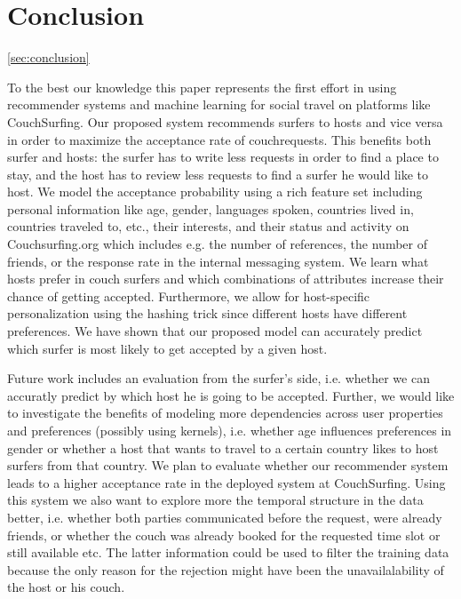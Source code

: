 \section{Conclusion} \autoref{sec:conclusion}

To the best our knowledge this paper represents the first effort in using recommender systems and machine learning for social travel on platforms like CouchSurfing.
Our proposed system recommends surfers to hosts and vice versa in order to maximize the acceptance rate of couchrequests. This benefits both surfer and hosts: the surfer has to write less requests in order to find a place to
stay, and the host has to review less requests to find a surfer he would like to host.
We model the acceptance probability using a rich feature set including personal information like age, gender, languages spoken, countries lived in, countries traveled to, etc., their interests, and their status and activity on Couchsurfing.org which includes e.g. the number of references, the number of friends, or the response rate in the internal messaging system.
We learn what hosts prefer in couch surfers and which combinations of attributes increase their chance of getting accepted. Furthermore, we allow for host-specific personalization using the hashing trick since different hosts have 
different preferences.
We have shown that our proposed model can accurately predict which surfer is most likely to get accepted by a given host. 

Future work includes an evaluation from the surfer's side, i.e. whether we can accuratly predict by which host he is going to be accepted. Further, we would like to investigate the benefits of modeling more dependencies across user properties and preferences (possibly using kernels), i.e. whether age influences preferences in gender or whether a host that wants to travel to a certain country likes to host surfers from that country. We plan to evaluate whether our recommender system leads to a higher acceptance rate in the deployed system at CouchSurfing. Using this system we also want to explore more the temporal structure in the data better, i.e. whether both parties communicated before the request, were already friends, or whether the couch was already booked for the requested time slot or still available etc. The latter information could be used to filter the training data because the only reason for the rejection might have been the unavailalability of the host or his couch.
